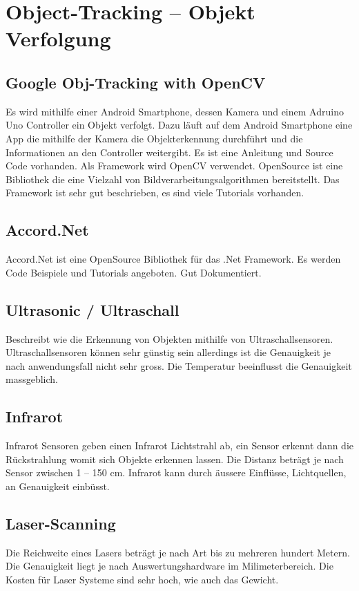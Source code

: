 \section{Object-Tracking – Objekt Verfolgung}
\subsection{Google Obj-Tracking with OpenCV}
Es wird mithilfe einer Android Smartphone, dessen Kamera und einem Adruino Uno Controller ein Objekt verfolgt. Dazu läuft auf dem Android Smartphone eine App die mithilfe der Kamera die Objekterkennung durchführt und die Informationen an den Controller weitergibt. Es ist eine Anleitung und Source Code vorhanden. Als Framework wird OpenCV verwendet. OpenSource ist eine Bibliothek die eine Vielzahl von Bildverarbeitungsalgorithmen bereitstellt. Das Framework ist sehr gut beschrieben, es sind viele Tutorials vorhanden.

\subsection{Accord.Net}
Accord.Net ist eine OpenSource Bibliothek für das .Net Framework. Es werden Code Beispiele und Tutorials angeboten. Gut Dokumentiert.

\subsection{Ultrasonic / Ultraschall }
Beschreibt wie die Erkennung von Objekten mithilfe von Ultraschallsensoren. Ultraschallsensoren können sehr günstig sein allerdings ist die Genauigkeit je nach anwendungsfall nicht sehr gross. Die Temperatur beeinflusst die Genauigkeit massgeblich. 

\subsection{Infrarot}
Infrarot Sensoren geben einen Infrarot Lichtstrahl ab, ein Sensor erkennt dann die Rückstrahlung womit sich Objekte erkennen lassen. Die Distanz beträgt je nach Sensor zwischen 1 – 150 cm. Infrarot kann durch äussere Einflüsse, Lichtquellen, an Genauigkeit einbüsst.

\subsection{Laser-Scanning}
Die Reichweite eines Lasers beträgt je nach Art bis zu mehreren hundert Metern. Die Genauigkeit liegt je nach Auswertungshardware im Milimeterbereich. Die Kosten für Laser Systeme sind sehr hoch, wie auch das Gewicht.

